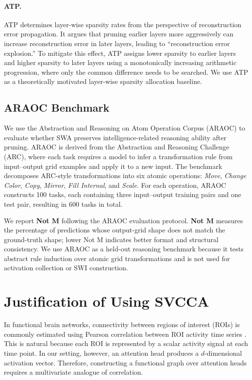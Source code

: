\paragraph{ATP.}
ATP determines layer-wise sparsity rates from the perspective of reconstruction error propagation. It argues that pruning earlier layers more aggressively can increase reconstruction error in later layers, leading to ``reconstruction error explosion.'' To mitigate this effect, ATP assigns lower sparsity to earlier layers and higher sparsity to later layers using a monotonically increasing arithmetic progression, where only the common difference needs to be searched. We use ATP as a theoretically motivated layer-wise sparsity allocation baseline.


\subsection{ARAOC Benchmark}

We use the Abstraction and Reasoning on Atom Operation Corpus (ARAOC) \cite{wu2025understanding} to evaluate whether SWA preserves intelligence-related reasoning ability after pruning. ARAOC is derived from the Abstraction and Reasoning Challenge (ARC), where each task requires a model to infer a transformation rule from input--output grid examples and apply it to a new input. The benchmark decomposes ARC-style transformations into six atomic operations: \textit{Move}, \textit{Change Color}, \textit{Copy}, \textit{Mirror}, \textit{Fill Internal}, and \textit{Scale}. For each operation, ARAOC constructs 100 tasks, each containing three input--output training pairs and one test pair, resulting in 600 tasks in total.

We report \textbf{Not M} following the ARAOC evaluation protocol. \textbf{Not M} measures the percentage of predictions whose output-grid shape does not match the ground-truth shape; lower Not M indicates better format and structural consistency. We use ARAOC as a held-out reasoning benchmark because it tests abstract rule induction over atomic grid transformations and is not used for activation collection or SWI construction.



\section{Justification of Using SVCCA}
\label{app:swa_svcca_justification}

In functional brain networks, connectivity between regions of interest (ROIs) is commonly estimated using Pearson correlation between ROI activity time series \cite{biswal1995functional, fox2005human}. This is natural because each ROI is represented by a scalar activity signal at each time point. In our setting, however, an attention head produces a $d$-dimensional activation vector. Therefore, constructing a functional graph over attention heads requires a multivariate analogue of correlation.

